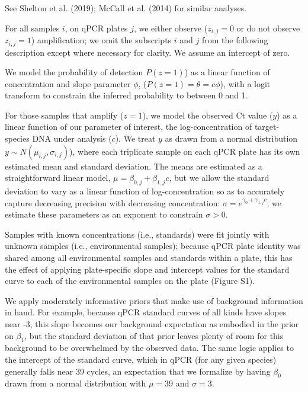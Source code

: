 \documentclass[
]{article}
\begin{document}
See Shelton et al. (2019); McCall et al. (2014) for similar analyses.

For all samples \(i\), on qPCR plates \(j\), we either observe
(\(z_{i,j} = 0\) or do not observe \(z_{i,j} = 1\)) amplification; we
omit the subscripts \(i\) and \(j\) from the following description
except where necessary for clarity. We assume an intercept of zero.

We model the probability of detection \(P(z = 1)\)) as a linear function
of concentration and slope parameter \(\phi\),
(\(P(z = 1) = \theta = c\phi\)), with a logit transform to constrain the
inferred probability to between 0 and 1.

For those samples that amplify (\(z = 1\)), we model the observed Ct
value (\(y\)) as a linear function of our parameter of interest, the
log-concentration of target-species DNA under analysis (\(c\)). We treat
\(y\) as drawn from a normal distribution
\(y \sim N(\mu_{i,j}, \sigma_{i,j})\)), where each triplicate sample on
each qPCR plate has its own estimated mean and standard deviation. The
means are estimated as a straightforward linear model,
\(\mu = \beta_{0,j} + \beta_{1,j}c\), but we allow the standard
deviation to vary as a linear function of log-concentration so as to
accurately capture decreasing precision with decreasing concentration:
\(\sigma = e^{\gamma_{0} + \gamma_{1,j}c}\); we estimate these
parameters as an exponent to constrain \(\sigma > 0\).

Samples with known concentrations (i.e., standards) were fit jointly
with unknown samples (i.e., environmental samples); because qPCR plate
identity was shared among all environmental samples and standards within
a plate, this has the effect of applying plate-specific slope and
intercept values for the standard curve to each of the environmental
samples on the plate (Figure S1).

We apply moderately informative priors that make use of background
information in hand. For example, because qPCR standard curves of all
kinds have slopes near -3, this slope becomes our background expectation
as embodied in the prior on \(\beta_1\), but the standard deviation of
that prior leaves plenty of room for this background to be overwhelmed
by the observed data. The same logic applies to the intercept of the
standard curve, which in qPCR (for any given species) generally falls
near 39 cycles, an expectation that we formalize by having \(\beta_0\)
drawn from a normal distribution with \(\mu = 39\) and \(\sigma = 3\).
\end{document}
